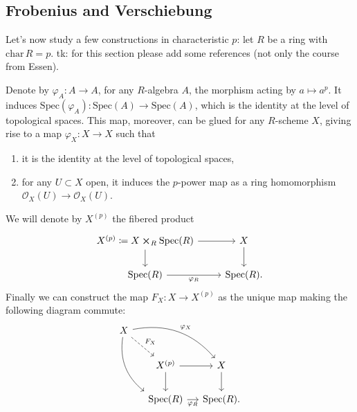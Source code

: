 \documentclass[../Main]{subfiles}
\begin{document}
\subsection{Frobenius and Verschiebung}\label{sec:FrobeniusVerschiebung}
Let's now study a few constructions in characteristic $p$:
let $R$ be a ring with $\mathrm{char}\, R = p$.
tk: for this section please add some references (not only the course from Essen).


\begin{defn}[]
	Denote by $\varphi_A\colon A \to A$, for any $R$-algebra $A$, the morphism
	acting by $a \mapsto a^p$.
	It induces $\mathrm{Spec}(\varphi_A)\colon \mathrm{Spec}(A) \to \mathrm{Spec}(A)$,
	which is the identity at the level of topological spaces.
	This map, moreover, can be glued for any $R$-scheme $X$, giving rise to a map
	$\varphi_X\colon X \to X$ such that
\begin{enumerate}
	\item it is the identity at the level of topological spaces,
	\item for any $U \subset X$ open, it induces the $p$-power map
		as a ring homomorphism $\mathcal{O}_{X}(U) \to \mathcal{O}_{ X }(U)$.
\end{enumerate}
	We will denote by $X^{(p)}$ the fibered product
	\begin{equation}
	\begin{tikzcd}
		X^{(p)} \coloneqq X \cross_{ R } \mathrm{Spec}(R) \arrow[r, "", rightarrow] 
		\arrow[d, "", rightarrow] &
		X \arrow[d, "", rightarrow] \\
		\mathrm{Spec}(R) \arrow[r, "\varphi_R"', rightarrow] &
		\mathrm{Spec}(R)
	.\end{tikzcd}
	\end{equation}
	Finally we can construct the map $F_X \colon X \to X^{(p)}$ as the unique map
	making the following diagram commute:
	\begin{equation}
	\begin{tikzcd}[row sep=2.0em, column sep=1.2em]
		X \arrow[rrd, "\varphi_X", rightarrow, bend left] 
		\arrow[rdd, "", rightarrow, bend right, end anchor=north west]
		\arrow[rd, "F_X", dashrightarrow] & & \\
		&
		X^{(p)} \arrow[r, "", rightarrow] 
		\arrow[d, "", rightarrow] &
		X \arrow[d, "", rightarrow] \\
		&
		\mathrm{Spec}(R) \arrow[r, "\varphi_R"', rightarrow] &
		\mathrm{Spec}(R)
	.\end{tikzcd}
	\end{equation}
\end{defn}
\end{document}
